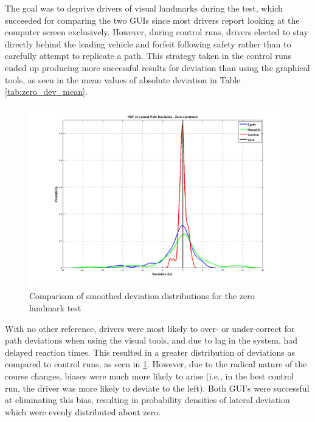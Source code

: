 The goal was to deprive drivers of visual landmarks during the test, which succeeded for comparing the two GUIs since most drivers report looking at the computer screen exclusively. However, during control runs, drivers elected to stay directly behind the leading vehicle and forfeit following safety rather than to carefully attempt to replicate a path. This strategy taken in the control runs ended up producing more successful results for deviation than using the graphical tools, as seen in the mean values of absolute deviation in Table \ref{tab:zero_dev_mean}. 
\begin{figure}[ht] \centering %
    \includegraphics[width=6in]{./figs/zero_landmark_dev_pdf.png}
    \caption{Comparison of smoothed deviation distributions for the zero landmark test} \label{fig:zero_dev_dist}
\end{figure}
With no other reference, drivers were most likely to over- or under-correct for path deviations when using the visual tools, and due to lag in the system, had delayed reaction times. This resulted in a greater distribution of deviations as compared to control runs, as seen in \ref{fig:zero_dev_dist}. However, due to the radical nature of the course changes, biases were much more likely to arise (i.e., in the best control run, the driver was more likely to deviate to the left). Both GUI's were successful at eliminating this bias, resulting in probability densities of lateral deviation which were evenly distributed about zero.

